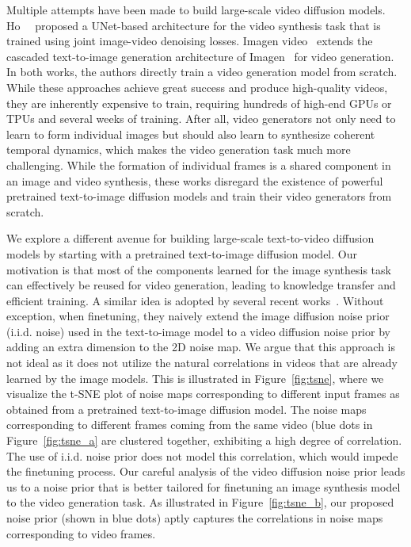 \documentclass[10pt,twocolumn,letterpaper]{article}
\begin{document}
Multiple attempts have been made to build large-scale video diffusion models. Ho~\etal~\cite{ho2022video} proposed a UNet-based architecture for the video synthesis task that is trained using joint image-video denoising losses. Imagen video~\cite{ho2022imagen} extends the cascaded text-to-image generation architecture of Imagen~\cite{saharia2022photorealistic} for video generation. In both works, the authors directly train a video generation model from scratch. While these approaches achieve great success and produce high-quality videos, they are inherently expensive to train, requiring hundreds of high-end GPUs or TPUs and several weeks of training. After all, video generators not only need to learn to form individual images but should also learn to synthesize coherent temporal dynamics, which makes the video generation task much more challenging. While the formation of individual frames is a shared component in an image and video synthesis, these works disregard the existence of powerful pretrained text-to-image diffusion models and train their video generators from scratch. 


We explore a different avenue for building large-scale text-to-video diffusion models by starting with a pretrained text-to-image diffusion model. Our motivation is that most of the components learned for the image synthesis task can effectively be reused for video generation, leading to knowledge transfer and efficient training. A similar idea is adopted by several recent works~\cite{singer2022make,zhou2022magicvideo,blattmann2023videoldm}.
Without exception, when finetuning, they naively extend the image diffusion noise prior (i.i.d. noise) used in the text-to-image model to a video diffusion noise prior by adding an extra dimension to the 2D noise map. We argue that this approach is not ideal as it does not utilize the natural correlations in videos that are already learned by the image models. This is illustrated in Figure~\ref{fig:tsne}, where we visualize the t-SNE plot of noise maps corresponding to different input frames as obtained from a pretrained text-to-image diffusion model. The noise maps corresponding to different frames coming from the same video (blue dots in Figure~\ref{fig:tsne_a} are clustered together, exhibiting a high degree of correlation. The use of i.i.d. noise prior does not model this correlation, which would impede the finetuning process. Our careful analysis of the video diffusion noise prior leads us to a noise prior that is better tailored for finetuning an image synthesis model to the video generation task. As illustrated in Figure~\ref{fig:tsne_b}, our proposed noise prior (shown in blue dots) aptly captures the correlations in noise maps corresponding to video frames.
\end{document}
